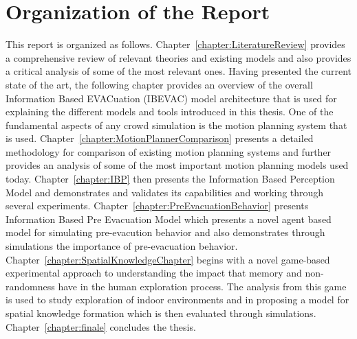 \section{Organization of the Report}
\label{Intro:Organisation}

 This report is organized as follows. Chapter~\ref{chapter:LiteratureReview} provides a comprehensive review of relevant theories and existing models and also provides a critical analysis of some of the most relevant ones. Having presented the current state of the art, the following chapter provides an overview of the overall Information Based EVACuation (IBEVAC) model architecture that is used for explaining the different models and tools introduced in this thesis. One of the fundamental aspects of any crowd simulation is the motion planning system that is used. Chapter~\ref{chapter:MotionPlannerComparison} presents a detailed methodology for comparison of existing motion planning systems and further provides an analysis of some of the most important motion planning models used today. Chapter~\ref{chapter:IBP} then presents the Information Based Perception Model and demonstrates and validates its capabilities and working through several experiments. Chapter~\ref{chapter:PreEvacuationBehavior} presents Information Based Pre Evacuation Model which presents a novel agent based model for simulating pre-evacution behavior and also demonstrates through simulations the importance of pre-evacuation behavior. Chapter~\ref{chapter:SpatialKnowledgeChapter} begins with a novel game-based experimental approach to understanding the impact that memory and non-randomness have in the human exploration process. The analysis from this game is used to study exploration of indoor environments and in proposing a model for spatial knowledge formation which is then evaluated through simulations. Chapter~\ref{chapter:finale} concludes the thesis.

